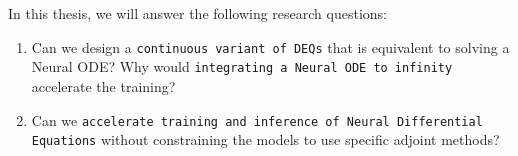 In this thesis, we will answer the following research questions:
%
\begin{enumerate}
  \item Can we design a \texttt{continuous variant of DEQs} that is equivalent to solving a Neural ODE? Why would \texttt{integrating a Neural ODE to infinity} accelerate the training?
  \item Can we \texttt{accelerate training and inference of Neural Differential Equations} without constraining the models to use specific adjoint methods?
\end{enumerate}
%
